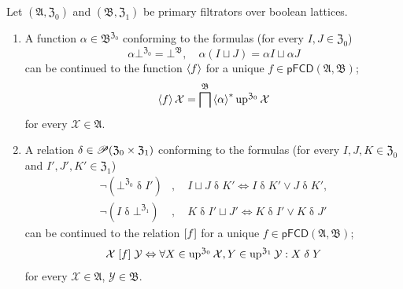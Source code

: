 \begin{thm}
\label{pf-cont}Let $(\mathfrak{A},\mathfrak{Z}_{0})$ and $(\mathfrak{B},\mathfrak{Z}_{1})$
be primary filtrators over boolean lattices.
\begin{enumerate}
\item \label{pf-cont-f}A function $\alpha\in\mathfrak{B}^{\mathfrak{Z}_{0}}$
conforming to the formulas (for every $I,J\in\mathfrak{Z}_{0}$)
\[
\alpha\bot^{\mathfrak{Z}_{0}}=\bot^{\mathfrak{B}},\quad\alpha(I\sqcup J)=\alpha I\sqcup\alpha J
\]
can be continued to the function $\left\langle f\right\rangle$ for a unique $f\in\mathsf{pFCD}(\mathfrak{A},\mathfrak{B})$;
\begin{equation}
\left\langle f\right\rangle\mathcal{X}=\bigsqcap^{\mathfrak{B}}\left\langle \alpha\right\rangle ^{\ast}\operatorname{up}^{\mathfrak{Z}_{0}}\mathcal{X}\label{pf-alpha-filter}
\end{equation}
for every $\mathcal{X}\in\mathfrak{A}$.
\item \label{pf-cont-r}A relation $\delta\in\mathscr{P}(\mathfrak{Z}_{0}\times\mathfrak{Z}_{1})$
conforming to the formulas (for every $I,J,K\in\mathfrak{Z}_{0}$
and $I',J',K'\in\mathfrak{Z}_{1}$)
\begin{equation}
\begin{aligned}\lnot(\bot^{\mathfrak{Z}_{0}}\mathrel\delta I') & ,\quad I\sqcup J\mathrel\delta K'\Leftrightarrow I\mathrel\delta K'\lor J\mathrel\delta K',\\
\lnot(I\mathrel\delta\bot^{\mathfrak{Z}_{1}}) & ,\quad K\mathrel\delta I'\sqcup J'\Leftrightarrow K\mathrel\delta I'\lor K\mathrel\delta J'
\end{aligned}
\label{pf-delta-props}
\end{equation}
can be continued to the relation $\mathrel{\left[f\right]}$ for a unique $f\in\mathsf{pFCD}(\mathfrak{A},\mathfrak{B})$;
\begin{equation}
\mathcal{X}\mathrel{\left[f\right]}\mathcal{Y}\Leftrightarrow\forall X\in\operatorname{up}^{\mathfrak{Z}_{0}}\mathcal{X},Y\in\operatorname{up}^{\mathfrak{Z}_{1}}\mathcal{Y}:X\mathrel\delta Y\label{pf-suprel-delta}
\end{equation}
for every $\mathcal{X}\in\mathfrak{A}$, $\mathcal{Y}\in\mathfrak{B}$.
\end{enumerate}
\end{thm}

